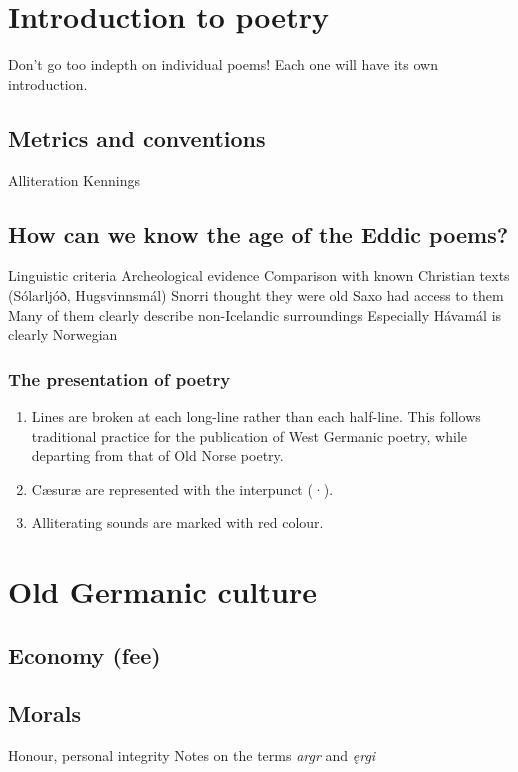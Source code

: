 \newpage


\section{Introduction to poetry}
  Don't go too indepth on individual poems! Each one will have its own introduction.
  \subsection{Metrics and conventions}
    Alliteration
    Kennings
  \subsection{How can we know the age of the Eddic poems?}
    Linguistic criteria
    Archeological evidence
    Comparison with known Christian texts (Sólarljóð, Hugsvinnsmál)
    Snorri thought they were old
    Saxo had access to them
    Many of them clearly describe non-Icelandic surroundings
      Especially Hávamál is clearly Norwegian

  \subsubsection{The presentation of poetry}
    \begin{enumerate}
      \item Lines are broken at each long-line rather than each half-line.  This follows traditional practice for the publication of West Germanic poetry, while departing from that of Old Norse poetry.
      \item Cæsuræ are represented with the interpunct (·).
      \item Alliterating sounds are marked with red colour.
    \end{enumerate}

\section{Old Germanic culture}
  \subsection{Economy (fee)}
  \subsection{Morals}
    Honour, personal integrity
    Notes on the terms \emph{argr} and \emph{ęrgi}
